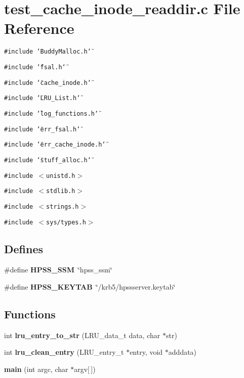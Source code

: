 \section{test\_\-cache\_\-inode\_\-readdir.c File Reference}
\label{test__cache__inode__readdir_8c}
{\tt \#include \char`\"{}BuddyMalloc.h\char`\"{}}\par
{\tt \#include \char`\"{}fsal.h\char`\"{}}\par
{\tt \#include \char`\"{}cache\_\-inode.h\char`\"{}}\par
{\tt \#include \char`\"{}LRU\_\-List.h\char`\"{}}\par
{\tt \#include \char`\"{}log\_\-functions.h\char`\"{}}\par
{\tt \#include \char`\"{}err\_\-fsal.h\char`\"{}}\par
{\tt \#include \char`\"{}err\_\-cache\_\-inode.h\char`\"{}}\par
{\tt \#include \char`\"{}stuff\_\-alloc.h\char`\"{}}\par
{\tt \#include $<$unistd.h$>$}\par
{\tt \#include $<$stdlib.h$>$}\par
{\tt \#include $<$strings.h$>$}\par
{\tt \#include $<$sys/types.h$>$}\par
\subsection*{Defines}
\begin{CompactItemize}
\item 
\#define {\bf HPSS\_\-SSM}~\char`\"{}hpss\_\-ssm\char`\"{}
\item 
\#define {\bf HPSS\_\-KEYTAB}~\char`\"{}/krb5/hpssserver.keytab\char`\"{}
\end{CompactItemize}
\subsection*{Functions}
\begin{CompactItemize}
\item 
int {\bf lru\_\-entry\_\-to\_\-str} (LRU\_\-data\_\-t data, char $\ast$str)
\item 
int {\bf lru\_\-clean\_\-entry} (LRU\_\-entry\_\-t $\ast$entry, void $\ast$adddata)
\item 
{\bf main} (int argc, char $\ast$argv[$\,$])
\end{CompactItemize}


